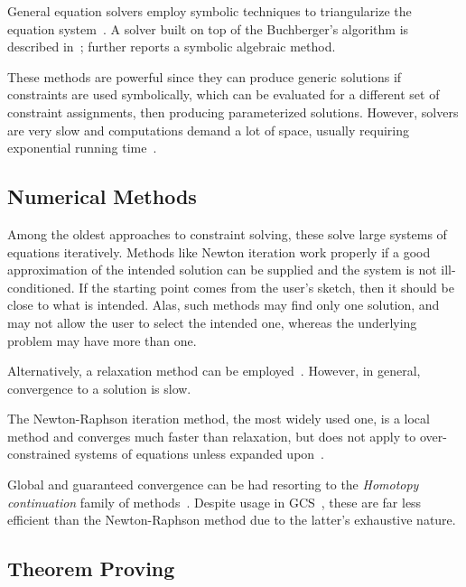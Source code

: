 General equation solvers employ symbolic techniques to triangularize the
equation system~\cite{Buchberger:1985:Grobner,Chou:1988:IWMMTPG}.  A solver
built on top of the Buchberger's algorithm is described
in~\cite{Buchanan:1993:CDS};  further reports a
symbolic algebraic method.

These methods are powerful since they can produce generic solutions if
constraints are used symbolically, which can be evaluated for a different set of
constraint assignments, then producing parameterized solutions.  However,
solvers are very slow and computations demand a lot of space, usually requiring
exponential running time~\cite{Durand:1998:SNTCS}.

\subsection{Numerical Methods}%
\label{sec:intro.constraints.numerical}

Among the oldest approaches to constraint solving, these solve large systems of
equations iteratively.  Methods like Newton iteration work properly if a good
approximation of the intended solution can be supplied and the system is not
ill-conditioned.  If the starting point comes from the user's sketch, then it
should be close to what is intended.  Alas, such methods may find only one
solution, and may not allow the user to select the intended one, whereas the
underlying problem may have more than one.

Alternatively, a relaxation method can be
employed~\cite{Borning:1989:PLATL,Hillyard:1978:CNSTDT,Sutherland:1964:Sketchpad}.
However, in general, convergence to a solution is slow.

The Newton-Raphson iteration method, the most widely used one, is a local method
and converges much faster than relaxation, but does not apply to
over-constrained systems of equations unless expanded
upon~\cite{Dedieu:2000:Newton}.

Global and guaranteed convergence can be had resorting to the \textit{Homotopy
continuation} family of methods~\cite{Allgower:1993:CPF}.  Despite usage in
\ac{GCS}~\cite{Durand:1998:SNTCS,Lamure:1996:SGCH}, these are far less efficient
than the Newton-Raphson method due to the latter's exhaustive nature.

\subsection{Theorem Proving}%
\label{sec:intro.constraints.proving}

